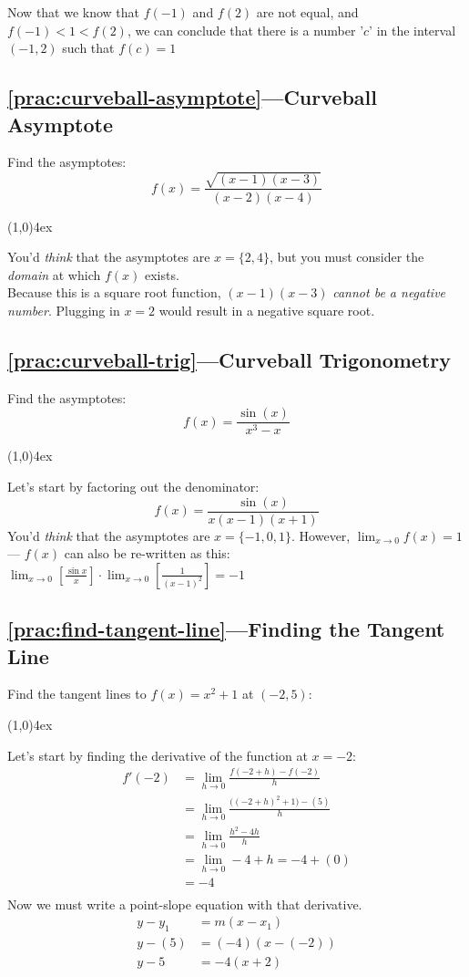 \documentclass{MathNotes}
\newcommand{\br}{
	\begin{center}
		\line(1,0){4ex}
	\end{center}}
\begin{document}
Now that we know that $f(-1)$ and $f(2)$ are not equal, and $f(-1)<1<f(2)$, we
can conclude that there is a number '$c$' in the interval $(-1, 2)$ such that
$f(c)=1$

\subsection*{\ref{prac:curveball-asymptote}---Curveball Asymptote}\label{ans:curveball-asymptote}
Find the asymptotes:
\begin{displaymath}
	f(x)=\frac{\sqrt{(x-1)(x-3)}}{(x-2)(x-4)}
\end{displaymath}
\br
You'd \textit{think} that the asymptotes are $x=\{2, 4\}$, but you must
consider the \textit{domain} at which $f(x)$ exists.
\\
Because this is a square root function, $(x-1)(x-3)$ \textit{cannot be a
	negative number}. Plugging in $x=2$ would result in a negative square root.

\subsection*{\ref{prac:curveball-trig}---Curveball Trigonometry}\label{ans:curveball-trig}
Find the asymptotes:
\begin{displaymath}
	f(x)=\frac{\sin(x)}{x^3-x}
\end{displaymath}
\br
Let's start by factoring out the denominator:
\begin{displaymath}
	f(x)=\frac{\sin(x)}{x(x-1)(x+1)}
\end{displaymath}
You'd \textit{think} that the asymptotes are $x=\{-1, 0, 1\}$. However,
$\lim_{x\to 0}f(x)=1$ --- $f(x)$ can also be re-written as this:
$\lim_{x\to 0}[\frac{\sin x}{x}] \cdot \lim_{x\to 0}[\frac{1}{(x-1)^2}]=-1$

\newpage
\subsection*{\ref{prac:find-tangent-line}---Finding the Tangent Line}\label{ans:find-tangent-line}
Find the tangent lines to $f(x)=x^2+1$ at $(-2, 5)$:
\br
Let's start by finding the derivative of the function at $x=-2$:
\begin{align*}
	f'(-2) & =\lim_{h\to 0}\frac{f(-2+h)-f(-2)}{h}              \\
	       & =\lim_{h\to 0}\frac{\bigl((-2+h)^2+1\bigr)-(5)}{h} \\
	       & =\lim_{h\to 0}\frac{h^2-4h}{h}                     \\
	       & =\lim_{h\to 0}-4+h = -4 + (0)                      \\
	       & =-4                                                \\
\end{align*}
Now we must write a point-slope equation with that derivative.
\begin{align*}
	y-y_1 & =m(x-x_1)     \\
	y-(5) & =(-4)(x-(-2)) \\
	y-5   & =-4(x+2)
\end{align*}
\end{document}

